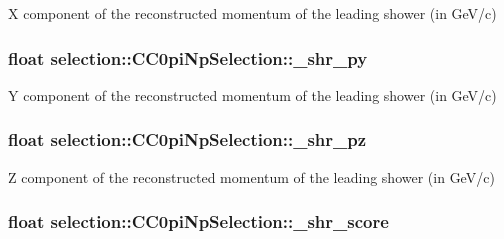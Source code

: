 X component of the reconstructed momentum of the leading shower (in Ge\-V/c) \hypertarget{classselection_1_1CC0piNpSelection_a436dd7081c84003dabb595289d745111}{
\subsubsection[{\-\_\-shr\-\_\-py}]{\setlength{\rightskip}{0pt plus 5cm}float selection\-::\-C\-C0pi\-Np\-Selection\-::\-\_\-shr\-\_\-py\hspace{0.3cm}{\ttfamily [private]}}}\label{classselection_1_1CC0piNpSelection_a436dd7081c84003dabb595289d745111}
Y component of the reconstructed momentum of the leading shower (in Ge\-V/c) \hypertarget{classselection_1_1CC0piNpSelection_a769319ad32b6ce49c7a5283b246303fa}{
\subsubsection[{\-\_\-shr\-\_\-pz}]{\setlength{\rightskip}{0pt plus 5cm}float selection\-::\-C\-C0pi\-Np\-Selection\-::\-\_\-shr\-\_\-pz\hspace{0.3cm}{\ttfamily [private]}}}\label{classselection_1_1CC0piNpSelection_a769319ad32b6ce49c7a5283b246303fa}
Z component of the reconstructed momentum of the leading shower (in Ge\-V/c) \hypertarget{classselection_1_1CC0piNpSelection_a9033ad097ef1b7a4e10b2b872b82f068}{
\subsubsection[{\-\_\-shr\-\_\-score}]{\setlength{\rightskip}{0pt plus 5cm}float selection\-::\-C\-C0pi\-Np\-Selection\-::\-\_\-shr\-\_\-score\hspace{0.3cm}{\ttfamily [private]}}}\label{classselection_1_1CC0piNpSelection_a9033ad097ef1b7a4e10b2b872b82f068}
